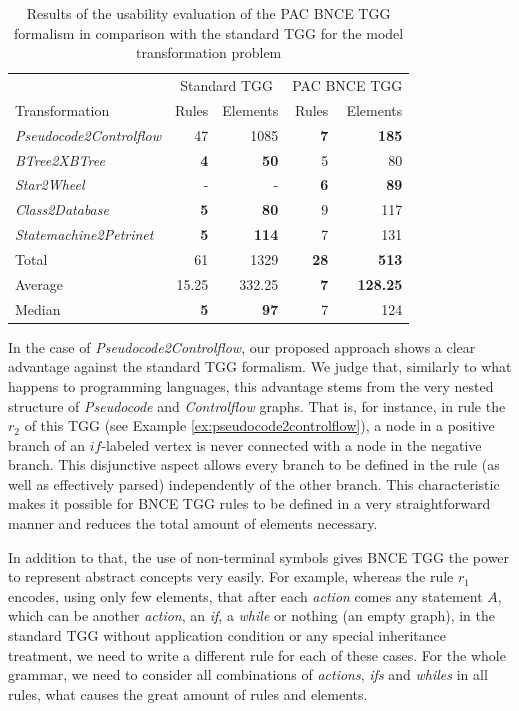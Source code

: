 \begin{table}[h]
	\centering
	\caption{Results of the usability evaluation of the PAC BNCE TGG formalism in comparison with the standard TGG for the model transformation problem}
	\label{tab:formalism-eval}
	\begin{tabular}{l r r r r }
		\hline
										& \multicolumn{2}{c}{Standard TGG}	& \multicolumn{2}{c}{PAC BNCE TGG}\\
		Transformation 					& Rules 		& Elements 		& Rules 		& Elements\\
		\hline
		\emph{Pseudocode2Controlflow}	& 47			& 1085			& \textbf{7}	& \textbf{185}	\\
		\emph{BTree2XBTree}				& \textbf{4}	& \textbf{50}	& 5				& 80 			\\
		\emph{Star2Wheel}				& -				& -				& \textbf{6} 	& \textbf{89} 	\\
		\emph{Class2Database}			& \textbf{5}	& \textbf{80}	& 9 			& 117  			\\
		\emph{Statemachine2Petrinet}	& \textbf{5}	& \textbf{114}	& 7				& 131 			\\
		\hline
		Total							& 61 			& 1329			& \textbf{28}	& \textbf{513}	\\
		Average							& 15.25 		& 332.25		& \textbf{7}	& \textbf{128.25}\\
		Median							& \textbf{5}	& \textbf{97}	& 7				& 124			\\
		\hline
	\end{tabular}
\end{table}

In the case of \emph{Pseudocode2Controlflow}, our proposed approach shows a clear advantage against the standard TGG formalism. We judge that, similarly to what happens to programming languages, this advantage stems from the very nested structure of \emph{Pseudocode} and \emph{Controlflow} graphs. That is, for instance, in rule the $r_2$ of this TGG (see Example \ref{ex:pseudocode2controlflow}), a node in a positive branch of an $if$-labeled vertex is never connected with a node in the negative branch. This disjunctive aspect allows every branch to be defined in the rule (as well as effectively parsed) independently of the other branch. This characteristic makes it possible for BNCE TGG rules to be defined in a very straightforward manner and reduces the total amount of elements necessary.

In addition to that, the use of non-terminal symbols gives BNCE TGG the power to represent abstract concepts very easily. For example, whereas the rule $r_1$ encodes, using only few elements, that after each \emph{action} comes any statement $A$, which can be another \emph{action}, an \emph{if}, a \emph{while} or nothing (an empty graph), in the standard TGG without application condition or any special inheritance treatment, we need to write a different rule for each of these cases. For the whole grammar, we need to consider all combinations of \emph{actions}, \emph{ifs} and \emph{whiles} in all rules, what causes the great amount of rules and elements.

